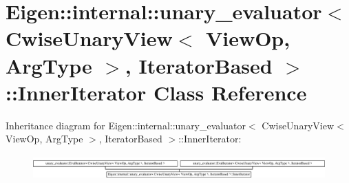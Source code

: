 \hypertarget{class_eigen_1_1internal_1_1unary__evaluator_3_01_cwise_unary_view_3_01_view_op_00_01_arg_type_011a5afe598192a9657664b0cfbd26765b}{}\section{Eigen\+:\+:internal\+:\+:unary\+\_\+evaluator$<$ Cwise\+Unary\+View$<$ View\+Op, Arg\+Type $>$, Iterator\+Based $>$\+:\+:Inner\+Iterator Class Reference}
\label{class_eigen_1_1internal_1_1unary__evaluator_3_01_cwise_unary_view_3_01_view_op_00_01_arg_type_011a5afe598192a9657664b0cfbd26765b}
Inheritance diagram for Eigen\+:\+:internal\+:\+:unary\+\_\+evaluator$<$ Cwise\+Unary\+View$<$ View\+Op, Arg\+Type $>$, Iterator\+Based $>$\+:\+:Inner\+Iterator\+:\begin{figure}[H]
\begin{center}
\leavevmode
\includegraphics[height=0.925620cm]{class_eigen_1_1internal_1_1unary__evaluator_3_01_cwise_unary_view_3_01_view_op_00_01_arg_type_011a5afe598192a9657664b0cfbd26765b}
\end{center}
\end{figure}
